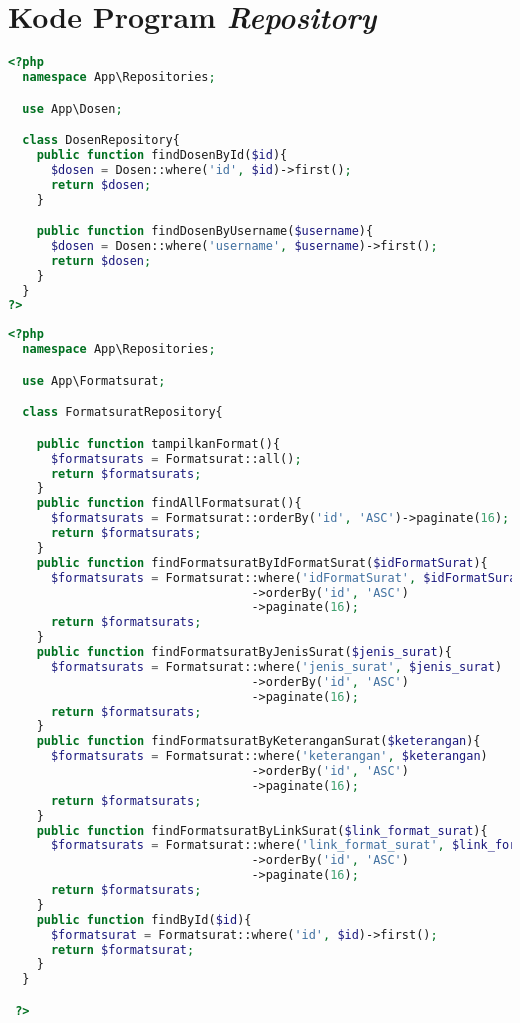 \chapter{Kode Program \textit{Repository}}
\label{lamp:D}


\begin{lstlisting}[language=php, caption=DosenRepository.php]
	<?php
  namespace App\Repositories;

  use App\Dosen;

  class DosenRepository{
    public function findDosenById($id){
      $dosen = Dosen::where('id', $id)->first();
      return $dosen;
    }

    public function findDosenByUsername($username){
      $dosen = Dosen::where('username', $username)->first();
      return $dosen;
    }
  }
?>
\end{lstlisting}

\begin{lstlisting}[language=php, caption=FormatsuratRepository.php]
	<?php
  namespace App\Repositories;

  use App\Formatsurat;

  class FormatsuratRepository{

    public function tampilkanFormat(){
      $formatsurats = Formatsurat::all();
      return $formatsurats;
    }
    public function findAllFormatsurat(){
      $formatsurats = Formatsurat::orderBy('id', 'ASC')->paginate(16);
      return $formatsurats;
    }
    public function findFormatsuratByIdFormatSurat($idFormatSurat){
      $formatsurats = Formatsurat::where('idFormatSurat', $idFormatSurat)
                                  ->orderBy('id', 'ASC')
                                  ->paginate(16);
      return $formatsurats;
    }
    public function findFormatsuratByJenisSurat($jenis_surat){
      $formatsurats = Formatsurat::where('jenis_surat', $jenis_surat)
                                  ->orderBy('id', 'ASC')
                                  ->paginate(16);
      return $formatsurats;
    }
    public function findFormatsuratByKeteranganSurat($keterangan){
      $formatsurats = Formatsurat::where('keterangan', $keterangan)
                                  ->orderBy('id', 'ASC')
                                  ->paginate(16);
      return $formatsurats;
    }
    public function findFormatsuratByLinkSurat($link_format_surat){
      $formatsurats = Formatsurat::where('link_format_surat', $link_format_surat)
                                  ->orderBy('id', 'ASC')
                                  ->paginate(16);
      return $formatsurats;
    }
    public function findById($id){
      $formatsurat = Formatsurat::where('id', $id)->first();
      return $formatsurat;
    }
  }

 ?>

\end{lstlisting}


